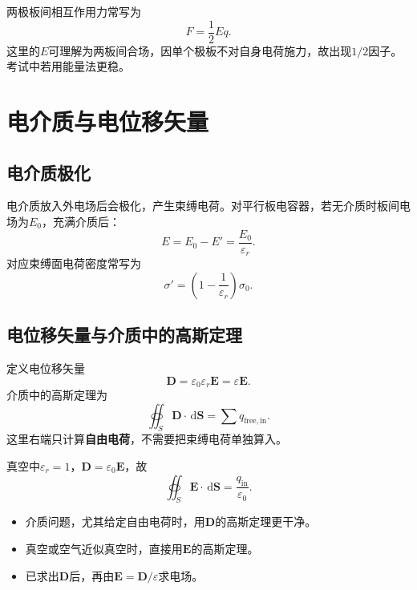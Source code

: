\documentclass[UTF8,zihao=-4]{ctexart}
\newcommand{\dd}{\,\mathrm d}
\newcommand{\eps}{\varepsilon}
\newcommand{\epsz}{\varepsilon_0}
\newcommand{\ve}[1]{\bm{#1}}
\newcommand{\E}{\ve E}
\newcommand{\D}{\ve D}
\newcommand{\dS}{\dd\ve S}
\begin{document}
\begin{warnbox}[平行板电容器的力]
两极板间相互作用力常写为
\[
F=\frac12 E q.
\]
这里的\(E\)可理解为两板间合场，因单个极板不对自身电荷施力，故出现\(1/2\)因子。考试中若用能量法更稳。
\end{warnbox}

\section{电介质与电位移矢量}

\subsection{电介质极化}

电介质放入外电场后会极化，产生束缚电荷。对平行板电容器，若无介质时板间电场为\(E_0\)，充满介质后：
\begin{equation}
E=E_0-E'=\frac{E_0}{\eps_r}.
\end{equation}
对应束缚面电荷密度常写为
\begin{equation}
\sigma'=\left(1-\frac{1}{\eps_r}\right)\sigma_0.
\end{equation}

\subsection{电位移矢量与介质中的高斯定理}

定义电位移矢量
\begin{equation}
\boxed{\D=\epsz\eps_r\E=\eps\E}.
\end{equation}
介质中的高斯定理为
\begin{equation}
\boxed{\oiint_S \D\cdot\dS=\sum q_{\mathrm{free,in}}}.
\end{equation}
这里右端只计算\textbf{自由电荷}，不需要把束缚电荷单独算入。

真空中\(\eps_r=1\)，\(\D=\epsz\E\)，故
\begin{equation}
\oiint_S \E\cdot\dS=\frac{q_{\mathrm{in}}}{\epsz}.
\end{equation}

\begin{keybox}[何时用\(\D\)，何时用\(\E\)]
\begin{itemize}
  \item 介质问题，尤其给定自由电荷时，用\(\D\)的高斯定理更干净。
  \item 真空或空气近似真空时，直接用\(\E\)的高斯定理。
  \item 已求出\(\D\)后，再由\(\E=\D/\eps\)求电场。
\end{itemize}
\end{keybox}
\end{document}
